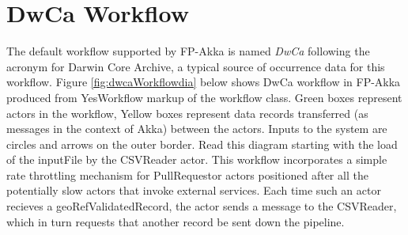 \documentclass{article}
\begin{document}
\section{DwCa Workflow} \label{dwcaworkflowsec} %
The default workflow supported by FP-Akka is named \emph{DwCa} following the acronym for Darwin Core Archive, a typical source of occurrence data for this workflow. Figure \ref{fig:dwcaWorkflowdia} below shows DwCa workflow in FP-Akka produced from YesWorkflow \citep{McPhillips2015} markup of the workflow class.  Green boxes represent actors in the workflow, Yellow boxes represent data records transferred (as messages in the context of Akka) between the actors.   Inputs to the system are circles and arrows on the outer border.
Read this diagram starting with the load of the inputFile by the CSVReader actor. This workflow incorporates a simple rate throttling mechanism for PullRequestor actors positioned after all the potentially slow actors that invoke external services. Each time such an actor recieves a geoRefValidatedRecord, the actor sends a message to the CSVReader, which in turn requests that another record be sent down the pipeline.
\end{document}
